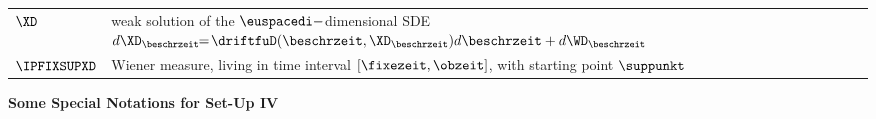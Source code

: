 \begin{longtable}{ll}

\hspace{-0.33cm} $\XD$ & weak solution of the $\euspacedi-$dimensional SDE $d\XD_{\beschrzeit} 
\negthinspace \negthinspace = \negthinspace \driftfuD({\beschrzeit},\XD_{\beschrzeit}) d{\beschrzeit} + d\WD_{\beschrzeit}$  
\\
\hspace{-0.33cm} $\IPFIXSUPXD$ & Wiener measure, living in time interval $[\fixezeit,\obzeit]$, with starting point $\suppunkt$ 
\\
 
\end{longtable}

\shakernewpage


{\bf Some Special Notations for Set-Up IV}


